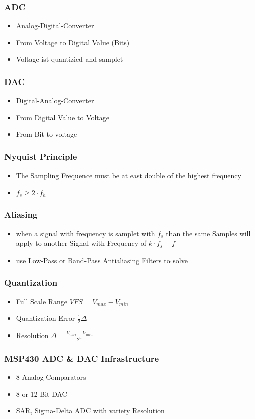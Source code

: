 \begin{multicols}{2}
\subsubsection{ADC}
\begin{itemize}
	\item Analog-Digital-Converter
	\item From Voltage to Digital Value (Bits)
	\item Voltage ist quantizied and samplet
\end{itemize}
\subsubsection{DAC}
\begin{itemize}
	\item Digital-Analog-Converter
	\item From Digital Value to Voltage
	\item From Bit to voltage 
\end{itemize}
\subsubsection{Nyquist Principle}
\begin{itemize}
	\item The Sampling Frequence must  be at east double of the highest frequency
	\item $f_s \ge 2 \cdot f_h$
\end{itemize}
\subsubsection{Aliasing}
\begin{itemize}
	\item when a signal with frequency is samplet with $f_s$ than the same Samples will apply to another Signal with Frequency of $k \cdot f_s \pm f$
	\item use Low-Pass or Band-Pass Antialiasing Filters to solve
\end{itemize}
\subsubsection{Quantization}
\begin{itemize}
	\item Full Scale Range $VFS=V_{max}-V_{min}$
	\item Quantization Error $ \frac{1}{2} \Delta$
	\item Resolution $\Delta = \frac{V_{max}-V_{min}}{2^n}$
\end{itemize}
\subsubsection{MSP430 ADC \& DAC Infrastructure}
\begin{itemize}
	\item 8 Analog Comparators
	\item 8 or 12-Bit \acs{DAC}
	\item \acs{SAR}, Sigma-Delta \acs{ADC} with variety Resolution
	\end{itemize}
\end{multicols}
\clearpage
